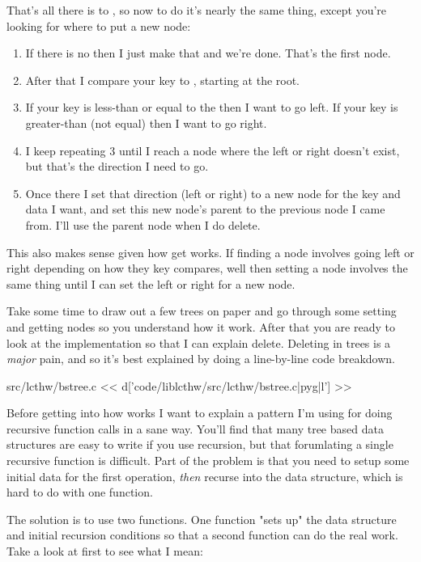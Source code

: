 That's all there is to , so now to do  it's nearly the
same thing, except you're looking for where to put a new node:

\begin{enumerate}
\item If there is no  then I just make that and we're done.  That's the first node.
\item After that I compare your key to , starting at the root.
\item If your key is less-than or equal to the  then I want to 
    go left.  If your key is greater-than (not equal) then I want to go right.
\item I keep repeating 3 until I reach a node where the left or right doesn't
    exist, but that's the direction I need to go.
\item Once there I set that direction (left or right) to a new node for the
    key and data I want, and set this new node's parent to the previous node
    I came from.  I'll use the parent node when I do delete.
\end{enumerate}

This also makes sense given how get works.  If finding a node involves going
left or right depending on how they key compares, well then setting a node 
involves the same thing until I can set the left or right for a new node.

Take some time to draw out a few trees on paper and go through some setting
and getting nodes so you understand how it work.  After that you are ready
to look at the implementation so that I can explain delete.  Deleting in
trees is a \emph{major} pain, and so it's best explained by doing a 
line-by-line code breakdown.


\begin{code}{src/lcthw/bstree.c}
<< d['code/liblcthw/src/lcthw/bstree.c|pyg|l'] >>
\end{code}

Before getting into how  works I want to explain a
pattern I'm using for doing recursive function calls in a sane way.
You'll find that many tree based data structures are easy to write
if you use recursion, but that forumlating a single recursive function
is difficult.  Part of the problem is that you need to setup some
initial data for the first operation, \emph{then} recurse into 
the data structure, which is hard to do with one function.

The solution is to use two functions.  One function "sets up" the 
data structure and initial recursion conditions so that a second
function can do the real work.   Take a look at 
first to see what I mean:

